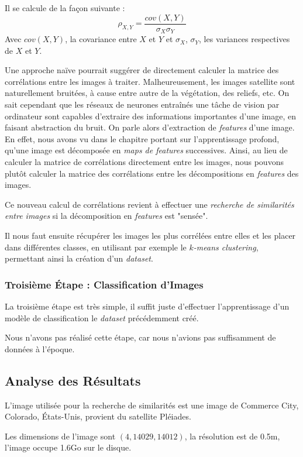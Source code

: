 \documentclass[a4paper, 11pt]{report}
\begin{document}
Il se calcule de la façon suivante :
$$\rho_{X,Y} = \frac{cov(X,Y)}{\sigma_X \sigma_Y}$$
Avec $cov(X,Y)$, la covariance entre $X$ et $Y$ et $\sigma_X$, $\sigma_Y$, les variances respectives de $X$ et $Y$.

Une approche naïve pourrait suggérer de directement calculer la matrice des corrélations entre les images à traiter. Malheureusement, les images satellite sont naturellement bruitées, à cause entre autre de la végétation, des reliefs, etc.
On sait cependant que les réseaux de neurones entraînés une tâche de vision par ordinateur sont capables d'extraire des informations importantes d'une image, en faisant abstraction du bruit.
On parle alors d'extraction de \emph{features} d'une image.
En effet, nous avons vu dans le chapitre portant sur l'apprentissage profond, qu'une image est décomposée en \emph{maps de features} successives.
Ainsi, au lieu de calculer la matrice de corrélations directement entre les images, nous pouvons plutôt calculer la matrice des corrélations entre les décompositions en \emph{features} des images.

Ce nouveau calcul de corrélations revient à effectuer une \emph{recherche de similarités entre images} si la décomposition en \emph{features} est "sensée".


Il nous faut ensuite récupérer les images les plus corrélées entre elles et les placer dans différentes classes, en utilisant par exemple le $k$\emph{-means clustering}, permettant ainsi la création d'un \emph{dataset}.

\subsubsection{Troisième Étape : Classification d'Images}

La troisième étape est très simple, il suffit juste d'effectuer l'apprentissage d'un modèle de classification le \emph{dataset} précédemment créé.

Nous n'avons pas réalisé cette étape, car nous n'avions pas suffisamment de données à l'époque.

\subsection{Analyse des Résultats}
L'image utilisée pour la recherche de similarités est une image de Commerce City, Colorado, États-Unis, provient du satellite Pléiades.

Les dimensions de l'image sont $(4, 14029, 14012)$, la résolution est de 0.5m, l'image occupe 1.6Go sur le disque.
\end{document}
